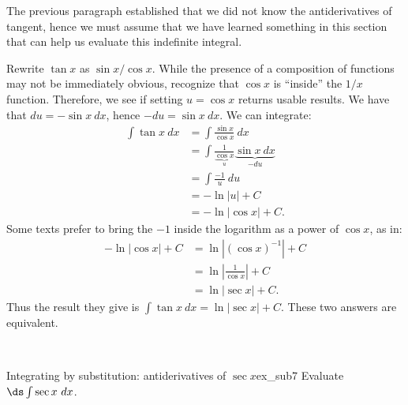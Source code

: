 \begin{solution}
{The previous paragraph established that we did not know the antiderivatives of tangent, hence we must assume that we have learned something in this section that  can help us evaluate this indefinite integral. 

Rewrite $\tan x$ as $\sin x/\cos x$. While the presence of a composition of functions may not be immediately obvious, recognize that $\cos x$ is ``inside'' the $1/x$ function. Therefore, we see if setting $u = \cos x$ returns usable results. We have that $du = -\sin x\ dx$, hence $-du = \sin x\ dx$. We can integrate:
\begin{align*}
		\int \tan x \ dx &= \int \frac{\sin x}{\cos x}\ dx \\
							&= \int \frac1{\underbrace{\cos x}_u}\underbrace{\sin x\ dx}_{-du} \\
							&= \int \frac {-1}u \ du\\
							&= -\ln |u| + C \\
							&= -\ln |\cos x| + C.
\end{align*}
Some texts prefer to bring the $-1$ inside the logarithm as a power of $\cos x$, as in:
\begin{align*}
-\ln |\cos x| + C &= \ln |(\cos x)^{-1}| + C\\
			&= \ln \left| \frac{1}{\cos x}\right| + C\\
			&= \ln |\sec x| + C.
\end{align*}
Thus the result they give is $\int \tan x \ dx = \ln|\sec x| + C$. These two answers are equivalent.
}\\

\end{solution}

\begin{example}{Integrating by substitution: antiderivatives of $\sec x$}{ex_sub7}
Evaluate $\ds\int \sec x\ dx$.
\end{example}



